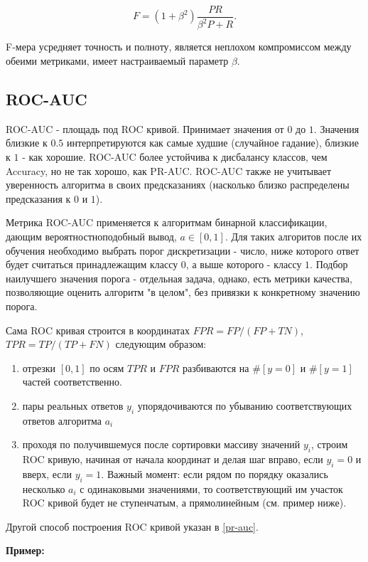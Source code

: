 $$
F = (1+\beta^2)\frac{PR}{\beta^2P + R}.
$$

F-мера усредняет точность и полноту, является неплохом компромиссом между обеими метриками, имеет настраиваемый параметр $\beta$.

\subsection{ROC-AUC}

ROC-AUC - площадь под ROC кривой. Принимает значения от $0$ до $1$. Значения близкие к $0.5$ интерпретируются как самые худшие (случайное гадание), близкие к $1$ - как хорошие. ROC-AUC более устойчива к дисбалансу классов, чем Accuracy, но не так хорошо, как PR-AUC. ROC-AUC также не учитывает уверенность алгоритма в своих предсказаниях (насколько близко распределены предсказания к $0$ и $1$).

Метрика ROC-AUC применяется к алгоритмам бинарной классификации, дающим вероятностноподобный вывод, $a\in[0, 1]$. Для таких алгоритов после их обучения необходимо выбрать порог дискретизации - число, ниже которого ответ будет считаться принадлежащим классу $0$, а выше которого - классу $1$. Подбор наилучшего значения порога - отдельная задача, однако, есть метрики качества, позволяющие оценить алгоритм "в целом", без привязки к конкретному значению порога.

Сама ROC кривая строится в координатах $FPR = FP/(FP + TN)$, $TPR = TP/(TP + FN)$ следующим образом:
\begin{enumerate}
    \item отрезки $[0, 1]$ по осям $TPR$ и $FPR$ разбиваются на $\#[y=0]$ и $\#[y=1]$ частей соответственно.
    \item пары реальных ответов $y_i$ упорядочиваются по убыванию соответствующих ответов алгоритма $a_i$
    \item проходя по получившемуся после сортировки массиву значений $y_i$, строим ROC кривую, начиная от начала координат и делая шаг вправо, если $y_i=0$ и вверх, если $y_i=1$. Важный момент: если рядом по порядку оказались несколько $a_i$ с одинаковыми значениями, то соответствующий им участок ROC кривой будет не ступенчатым, а прямолинейным (см. пример ниже).
\end{enumerate}

Другой способ построения ROC кривой указан в \ref{pr-auc}.

\textbf{Пример:}

